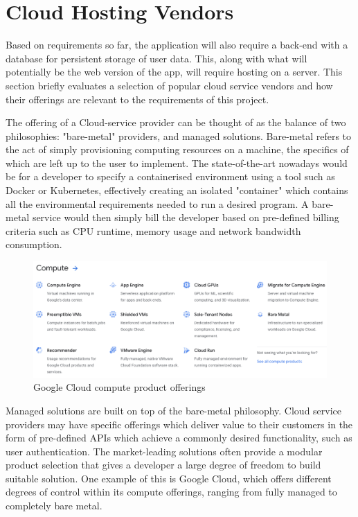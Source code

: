 \section{Cloud Hosting Vendors}
Based on requirements so far, the application will also require a back-end with a database for persistent storage of user data. This, along with what will potentially be the web version of the app, will require hosting on a server. This section briefly evaluates a selection of popular cloud service vendors and how their offerings are relevant to the requirements of this project.

The offering of a Cloud-service provider can be thought of as the balance of two philosophies: "bare-metal" providers, and managed solutions. Bare-metal refers to the act of simply provisioning computing resources on a machine, the specifics of which are left up to the user to implement. The state-of-the-art nowadays would be for a developer to specify a containerised environment using a tool such as Docker or Kubernetes, effectively creating an isolated "container" which contains all the environmental requirements needed to run a desired program. A bare-metal service would then simply bill the developer based on pre-defined billing criteria such as CPU runtime, memory usage and network bandwidth consumption.

\begin{figure}[h]
    \begin{center}
        \includegraphics[scale=0.4]{images/google_cloud_compute_offerings.png}
    \end{center}
    \caption{Google Cloud compute product offerings}
    \label{gcp_compute_offerings}
\end{figure}

Managed solutions are built on top of the bare-metal philosophy. Cloud service providers may have specific offerings which deliver value to their customers in the form of pre-defined APIs which achieve a commonly desired functionality, such as user authentication. The market-leading solutions often provide a modular product selection that gives a developer a large degree of freedom to build suitable solution. One example of this is Google Cloud, which offers different degrees of control within its compute offerings, ranging from fully managed to completely bare metal.

